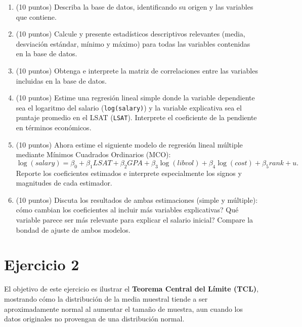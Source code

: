 \documentclass[letterpaper,11pt]{article}
\begin{document}
\begin{enumerate}
    \item (10 puntos) Describa la base de datos, identificando su origen y las variables que contiene. 
    
    \item (10 puntos) Calcule y presente estadísticos descriptivos relevantes (media, desviación estándar, mínimo y máximo) para todas las variables contenidas en la base de datos.
    
    \item (10 puntos) Obtenga e interprete la matriz de correlaciones entre las variables incluidas en la base de datos.
    
    \item (10 puntos) Estime una regresión lineal simple donde la variable dependiente sea el logaritmo del salario (\texttt{log(salary)}) y la variable explicativa sea el puntaje promedio en el LSAT (\texttt{LSAT}). Interprete el coeficiente de la pendiente en términos económicos.
    
    \item (10 puntos) Ahora estime el siguiente modelo de regresión lineal múltiple mediante Mínimos Cuadrados Ordinarios (MCO):
    \[
        \log(salary) = \beta_0 + \beta_1 LSAT + \beta_2 GPA + \beta_3 \log(libvol) + \beta_4 \log(cost) + \beta_5 rank + u.
    \]
    Reporte los coeficientes estimados e interprete especialmente los signos y magnitudes de cada estimador.
    
    \item (10 puntos) Discuta los resultados de ambas estimaciones (simple y múltiple): cómo cambian los coeficientes al incluir más variables explicativas? Qué variable parece ser más relevante para explicar el salario inicial? Compare la bondad de ajuste de ambos modelos.
\end{enumerate}





\section*{Ejercicio 2}
 
El objetivo de este ejercicio es ilustrar el \textbf{Teorema Central del Límite (TCL)}, mostrando cómo la distribución de la media muestral tiende a ser aproximadamente normal al aumentar el tamaño de muestra, aun cuando los datos originales no provengan de una distribución normal.
\end{document}
